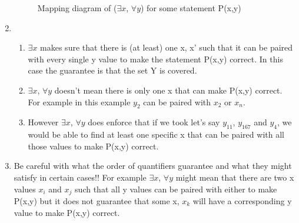 \documentclass[11pt]{article}
\begin{document}
\begin{enumerate}
\begin{figure}[ht]
\centering
{}
\caption{Mapping diagram of ($\exists x$, $\forall y$) for some statement P(x,y)}
\end{figure}
\item 
\begin{enumerate}
\item $\exists x$ makes sure that there is (at least) one x, x' such that it can be paired with every single y value to make the statement P(x,y) correct. In this case the guarantee is that the set Y is covered.
\item $\exists x$, $\forall y$ doesn't mean there is only one x that can make P(x,y) correct. For example in this example $y_2$ can be paired with $x_2$ or $x_n$. 
\item However $\exists x$, $\forall y$ does enforce that if we took let's say $y_11$, $y_167$ and $y_4$, we would be able to find at least one specific x that can be paired with all those values to make P(x,y) correct.
\end{enumerate}
\item Be careful with what the order of quantifiers guarantee and what they might satisfy in certain cases!! For example $\exists x$, $\forall y$ might mean that there are two x values $x_i$ and $x_j$ such that all y values can be paired with either to make P(x,y) but it does not guarantee that some x, $x_k$ will have a corresponding y value to make P(x,y) correct. 

\end{enumerate}
\newpage
\end{document}
